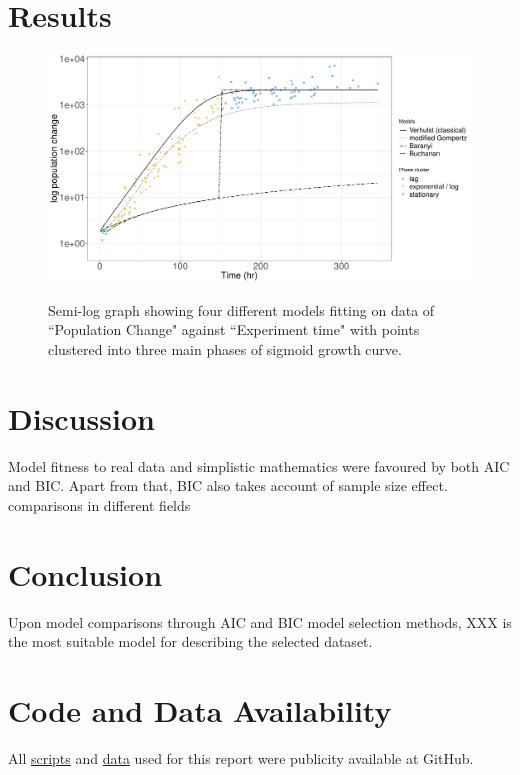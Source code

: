 \documentclass[a4paper, 11pt]{article}
\begin{document}
	\section*{Results}
	\begin{figure}[h]
		\centering\includegraphics[width=\linewidth]{Log_data.pdf}\label{semi-log}
		\caption{Semi-log graph showing four different models fitting on data of ``Population Change" against ``Experiment time" with points clustered into three main phases of sigmoid growth curve.}
	\end{figure}
	\section*{Discussion}
	Model fitness to real data and simplistic mathematics were favoured by both AIC\autocite{johnson2004model,akaike1998information,burnhamdr} and BIC\autocite{johnson2004model,turchin2003complex}.  Apart from that, BIC also takes account of sample size effect\autocite{johnson2004model,turchin2003complex}.\\
	comparisons in different fields\autocite{kuha2004aic,aho2014model,yang2005can,penny2012comparing,vrieze2012model,wang2006comparison,acquah2010comparison,edwards2010selecting}
	
	\section*{Conclusion}
	Upon model comparisons through AIC\autocite{akaike1998information,burnhamdr} and BIC\autocite{schwarz1978estimating} model selection methods, XXX is the most suitable model for describing the selected dataset.
	\section*{Code and Data Availability}
	All \href{https://github.com/ph-u/CMEECourseWork_pmH/tree/master/MiniProject/code}{scripts} and \href{https://github.com/ph-u/CMEECourseWork_pmH/tree/master/MiniProject/data}{data} used for this report were publicity available at GitHub.
	\nocite{*}\printbibliography
\end{document}
